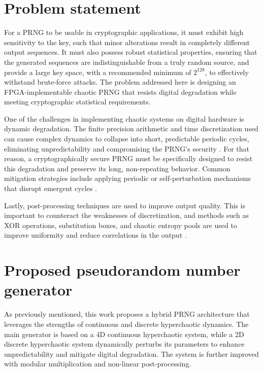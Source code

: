 \documentclass[preprint,12pt]{elsarticle}
\begin{document}
\section{Problem statement}\label{sec_2}
For a PRNG to be usable in cryptographic applications, it must exhibit high sensitivity to the key, such that minor alterations result in completely different output sequences. It must also possess robust statistical properties, ensuring that the generated sequences are indistinguishable from a truly random source, and provide a large key space, with a recommended minimum of $2^{128}$, to effectively withstand brute-force attacks. The problem addressed here is designing an FPGA-implementable chaotic PRNG that resists digital degradation while meeting cryptographic statistical requirements.

One of the challenges in implementing chaotic systems on digital hardware is dynamic degradation. The finite precision arithmetic and time discretization used can cause complex dynamics to collapse into short, predictable periodic cycles, eliminating unpredictability and compromising the PRNG's security \cite{senouci_fpga_2017, hobincu_fpga_2018}. For that reason, a cryptographically secure PRNG must be specifically designed to resist this degradation and preserve its long, non-repeating behavior. Common mitigation strategies include applying periodic or self-perturbation mechanisms that disrupt emergent cycles \cite{hocine_prng_2023}. 

Lastly, post-processing techniques are used to improve output quality. This is important to counteract the weaknesses of discretization, and methods such as XOR operations, substitution boxes, and chaotic entropy pools are used to improve uniformity and reduce correlations in the output \cite{li_dynamic_2019, garipcan_trng_2020}.

\section{Proposed pseudorandom number generator}\label{sec_3}
As previously mentioned, this work proposes a hybrid PRNG architecture that leverages the strengths of continuous and discrete hyperchaotic dynamics. The main generator is based on a 4D continuous hyperchaotic system, while a 2D discrete hyperchaotic system dynamically perturbs its parameters to enhance unpredictability and mitigate digital degradation. The system is further improved with modular multiplication and non-linear post-processing.
\end{document}
